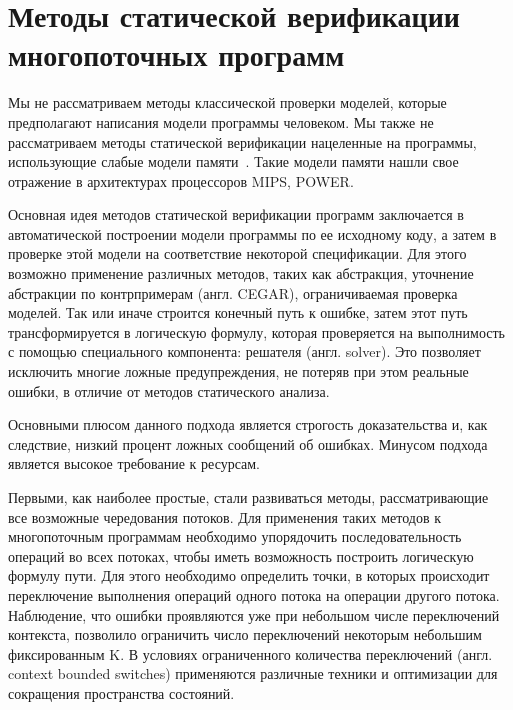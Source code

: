 
\section{Методы статической верификации многопоточных программ}
\label{rw:bmc}

Мы не рассматриваем методы классической проверки моделей, которые предполагают написания модели программы человеком. 
Мы также не рассматриваем методы статической верификации нацеленные на программы, использующие слабые модели памяти~\cite{Alglave:2013,Zhang:2015,Abdulla:2017}. 
Такие модели памяти нашли свое отражение в архитектурах процессоров MIPS, POWER.

Основная идея методов статической верификации программ заключается в автоматической построении модели программы по ее исходному коду, а затем в проверке этой модели на соответствие некоторой спецификации.
Для этого возможно применение различных методов, таких как абстракция, уточнение абстракции по контрпримерам (англ. CEGAR), ограничиваемая проверка моделей.
Так или иначе строится конечный путь к ошибке, затем этот путь трансформируется в логическую формулу, которая проверяется на выполнимость с помощью специального компонента: решателя (англ. solver).
Это позволяет исключить многие ложные предупреждения, не потеряв при этом реальные ошибки, в отличие от методов статического анализа.

Основными плюсом данного подхода является строгость доказательства и, как следствие, низкий процент ложных сообщений об ошибках.
Минусом подхода является высокое требование к ресурсам.

Первыми, как наиболее простые, стали развиваться методы, рассматривающие все возможные чередования потоков.
Для применения таких методов к многопоточным программам необходимо упорядочить последовательность операций во всех потоках, чтобы иметь возможность построить логическую формулу пути.
Для этого необходимо определить точки, в которых происходит переключение выполнения операций одного потока на операции другого потока.
Наблюдение, что ошибки проявляются уже при небольшом числе переключений контекста, позволило ограничить число переключений некоторым небольшим фиксированным K.
В условиях ограниченного количества переключений (англ. context bounded switches) применяются различные техники и оптимизации для сокращения пространства состояний. 

